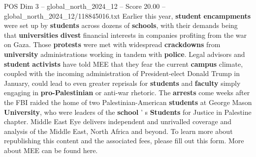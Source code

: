 \begin{textsample}{POS Dim 3 – global\_north\_2024\_12 – Score 20.00 – global\_north\_2024\_12/118845016.txt}
Earlier this year, \textbf{student} \textbf{encampments} were set up by \textbf{students} across dozens of \textbf{schools}, with their demands being that \textbf{universities} \textbf{divest} financial interests in companies profiting from the war on Gaza.
Those \textbf{protests} were met with widespread \textbf{crackdowns} from \textbf{university} administrations working in tandem with \textbf{police}.
Legal advisors and \textbf{student} \textbf{activists} have told MEE that they fear the current \textbf{campus} climate, coupled with the incoming administration of President-elect Donald Trump in January, could lead to even greater reprisals for \textbf{students} and \textbf{faculty} simply engaging in \textbf{pro-Palestinian} or anti-war rhetoric.
The \textbf{arrests} come weeks after the FBI raided the home of two Palestinian-American \textbf{students} at George Mason \textbf{University}, who were leaders of the \textbf{school} ' s \textbf{Students} for Justice in Palestine chapter.
Middle East Eye delivers independent and unrivalled coverage and analysis of the Middle East, North Africa and beyond.
To learn more about republishing this content and the associated fees, please fill out this form.
More about MEE can be found here.

\end{textsample}
